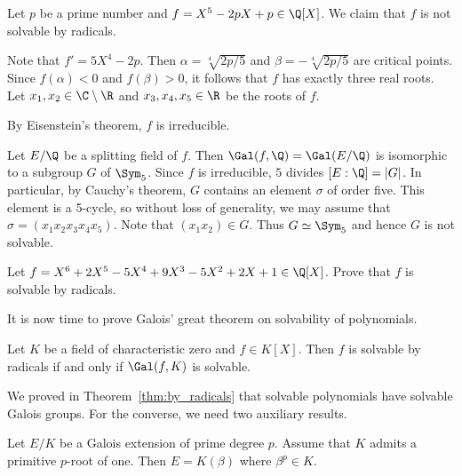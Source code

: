 \begin{example}
    Let $p$ be a prime number and $f=X^5-2pX+p\in\Q[X]$. 
    We claim that 
    $f$ is not solvable by radicals. 

    Note that $f'=5X^4-2p$. Then $\alpha=\sqrt[4]{2p/5}$ and $\beta=-\sqrt[4]{2p/5}$
    are critical points. Since $f(\alpha)<0$ and $f(\beta)>0$, it follows that $f$ has
    exactly three real roots. Let 
    $x_1,x_2\in\C\setminus\R$ and $x_3,x_4,x_5\in\R$ be the roots
    of $f$. 
    
    By Eisenstein's theorem, $f$ is irreducible. 
    
    Let $E/\Q$ be a splitting field of $f$. 
    Then $\Gal(f,\Q)=\Gal(E/\Q)$ is isomorphic 
    to a subgroup $G$ of $\Sym_5$.
    Since 
    $f$ is irreducible, $5$ divides $[E:\Q]=|G|$. In particular, 
    by Cauchy's theorem, $G$ contains an element $\sigma$ of order five. This element
    is a 5-cycle, so without loss of generality, we may assume that 
    $\sigma=(x_1x_2x_3x_4x_5)$. Note that 
    $(x_1x_2)\in G$. Thus $G\simeq\Sym_5$ and hence
    $G$ is not solvable. 
\end{example}

\begin{exercise}
    Let $f=X^6+2X^5-5X^4+9X^3-5X^2+2X+1\in\Q[X]$. 
    Prove that $f$ is solvable by radicals. 
\end{exercise}



It is now time to prove Galois' great theorem on solvability 
of polynomials. 

\begin{theorem}[Galois]
\label{thm:Galois_great}
    Let $K$ be a field of characteristic zero and $f\in K[X]$. 
    Then $f$ is solvable by radicals if and only if $\Gal(f,K)$ is solvable. 
\end{theorem}

We proved in Theorem~\ref{thm:by_radicals} that solvable 
polynomials have solvable Galois groups. 
For the converse, we need two auxiliary results. 

\begin{lemma}
\label{lem:E=K(beta)}
    Let $E/K$ be a Galois extension of prime degree $p$. Assume that $K$ admits a primitive $p$-root of one. 
    Then $E=K(\beta)$ where $\beta^p\in K$. 
\end{lemma}

